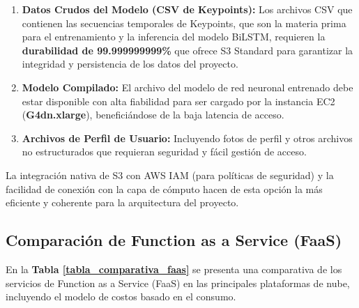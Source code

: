 \begin{enumerate}[label=\arabic*., nosep, itemsep=0pt]
    \item \textbf{Datos Crudos del Modelo (CSV de Keypoints):} Los archivos CSV que contienen las secuencias temporales de Keypoints, que son la materia prima para el entrenamiento y la inferencia del modelo BiLSTM, requieren la \textbf{durabilidad de 99.999999999\%} que ofrece S3 Standard para garantizar la integridad y persistencia de los datos del proyecto.
    \item \textbf{Modelo Compilado:} El archivo del modelo de red neuronal entrenado debe estar disponible con alta fiabilidad para ser cargado por la instancia EC2 (\textbf{G4dn.xlarge}), beneficiándose de la baja latencia de acceso.
    \item \textbf{Archivos de Perfil de Usuario:} Incluyendo fotos de perfil y otros archivos no estructurados que requieran seguridad y fácil gestión de acceso.
\end{enumerate}

La integración nativa de S3 con AWS IAM (para políticas de seguridad) y la facilidad de conexión con la capa de cómputo hacen de esta opción la más eficiente y coherente para la arquitectura del proyecto.

\subsection{Comparación de Function as a Service (FaaS)}

En la \textbf{Tabla \ref{tabla_comparativa_faas}} se presenta una comparativa de los servicios de Function as a Service (FaaS) en las principales plataformas de nube, incluyendo el modelo de costos basado en el consumo.

